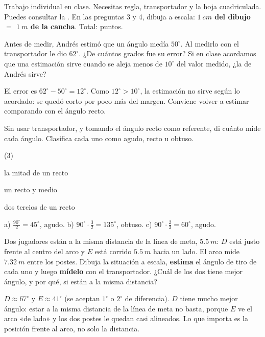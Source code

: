 \documentclass[11pt]{article}
\begin{document}
\encabezado

\begin{instrucciones}
Trabajo individual en clase. Necesitas regla, transportador y la hoja cuadriculada. Puedes
consultar la . En las preguntas 3 y 4, dibuja a escala:
\textbf{$\qty{1}{cm}$ del dibujo $=$ $\qty{1}{m}$ de la cancha}. Total: \totalpuntos{} puntos.
\end{instrucciones}

\begin{preguntas}

\pregunta[1] Antes de medir, Andrés estimó que un ángulo medía $50^\circ$. Al medirlo con el
transportador le dio $62^\circ$. ¿De cuántos grados fue su error? Si en clase acordamos que
una estimación sirve cuando se aleja menos de $10^\circ$ del valor medido, ¿la de Andrés sirve?
\begin{solucion}[2.5cm]
El error es $62^\circ - 50^\circ = 12^\circ$. Como $12^\circ > 10^\circ$, la estimación no
sirve según lo acordado: se quedó corto por poco más del margen. Conviene volver a estimar
comparando con el ángulo recto.
\end{solucion}

\pregunta[1] Sin usar transportador, y tomando el ángulo recto como referente, di cuánto mide
cada ángulo. Clasifica cada uno como agudo, recto u obtuso.
\begin{opciones*}(3)
  \item la mitad de un recto
  \item un recto y medio
  \item dos tercios de un recto
\end{opciones*}
\begin{solucion}[2.5cm]
a) $\frac{90^\circ}{2} = 45^\circ$, agudo. \quad b) $90^\circ \cdot \frac{3}{2} = 135^\circ$,
obtuso. \quad c) $90^\circ \cdot \frac{2}{3} = 60^\circ$, agudo.
\end{solucion}

\pregunta[2] Dos jugadores están a la misma distancia de la línea de meta, $\qty{5,5}{m}$:
$D$ está justo frente al centro del arco y $E$ está corrido $\qty{5,5}{m}$ hacia un lado.
El arco mide $\qty{7,32}{m}$ entre los postes. Dibuja la situación a escala, \textbf{estima}
el ángulo de tiro de cada uno y luego \textbf{mídelo} con el transportador. ¿Cuál de los dos
tiene mejor ángulo, y por qué, si están a la misma distancia?
\begin{solucion}[6cm]
$D \approx 67^\circ$ y $E \approx 41^\circ$ (se aceptan $1^\circ$ o $2^\circ$ de diferencia).
$D$ tiene mucho mejor ángulo: estar a la misma distancia de la línea de meta no basta, porque
$E$ ve el arco «de lado» y los dos postes le quedan casi alineados. Lo que importa es la
posición frente al arco, no solo la distancia.
\end{solucion}


\end{preguntas}
\end{document}
